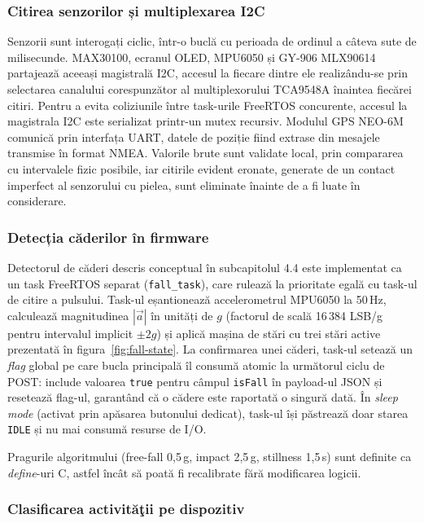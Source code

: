 \documentclass[12pt,a4paper,twoside]{article}
\begin{document}
\subsubsection{Citirea senzorilor și multiplexarea I2C}

Senzorii sunt interogați ciclic, într-o buclă cu perioada de ordinul a câteva sute de milisecunde. MAX30100, ecranul OLED, MPU6050 și GY-906 MLX90614 partajează aceeași magistrală I2C, accesul la fiecare dintre ele realizându-se prin selectarea canalului corespunzător al multiplexorului TCA9548A înaintea fiecărei citiri. Pentru a evita coliziunile între task-urile FreeRTOS concurente, accesul la magistrala I2C este serializat printr-un mutex recursiv. Modulul GPS NEO-6M comunică prin interfața UART, datele de poziție fiind extrase din mesajele transmise în format NMEA. Valorile brute sunt validate local, prin compararea cu intervalele fizic posibile, iar citirile evident eronate, generate de un contact imperfect al senzorului cu pielea, sunt eliminate înainte de a fi luate în considerare.

\subsubsection{Detecția căderilor în firmware}

Detectorul de căderi descris conceptual în subcapitolul 4.4 este implementat ca un task FreeRTOS separat (\texttt{fall\_task}), care rulează la prioritate egală cu task-ul de citire a pulsului. Task-ul eșantionează accelerometrul MPU6050 la 50\,Hz, calculează magnitudinea $|\vec{a}|$ în unități de $g$ (factorul de scală 16\,384 LSB/g pentru intervalul implicit $\pm 2g$) și aplică mașina de stări cu trei stări active prezentată în figura~\ref{fig:fall-state}. La confirmarea unei căderi, task-ul setează un \textit{flag} global pe care bucla principală îl consumă atomic la următorul ciclu de POST: include valoarea \texttt{true} pentru câmpul \texttt{isFall} în payload-ul JSON și resetează flag-ul, garantând că o cădere este raportată o singură dată. În \textit{sleep mode} (activat prin apăsarea butonului dedicat), task-ul își păstrează doar starea \texttt{IDLE} și nu mai consumă resurse de I/O.

Pragurile algoritmului (free-fall 0,5\,g, impact 2,5\,g, stillness 1,5\,s) sunt definite ca \textit{define}-uri C, astfel încât să poată fi recalibrate fără modificarea logicii.

\subsubsection{Clasificarea activităţii pe dispozitiv}
\end{document}
